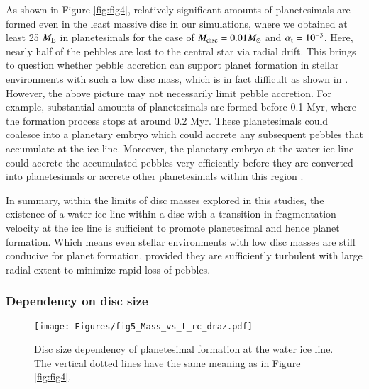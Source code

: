 \documentclass{aa}
\begin{document}
As shown in Figure \ref{fig:fig4}, relatively significant amounts of planetesimals are formed even in the least massive disc in our simulations, where we obtained at least 25 $M_{\rm{E}}$ in planetesimals for the case of $M_{\rm{disc}}=0.01 M_{\odot}$ and $\alpha_{\rm t}=10^{-3}$. Here, nearly half of the pebbles are lost to the central star via radial drift. This brings to question whether pebble accretion can support planet formation in stellar environments with such a low disc mass, which is in fact difficult as shown in \cite{SavvidouBitsch2023}. However, the above picture may not necessarily limit pebble accretion. For example, substantial amounts of planetesimals are formed before 0.1 Myr, where the formation process stops at around 0.2 Myr. These planetesimals could coalesce into a planetary embryo which could accrete any subsequent pebbles that accumulate at the ice line. Moreover, the planetary embryo at the water ice line could accrete the accumulated pebbles very efficiently before they are converted into planetesimals \citep{Morbidelli2020,Izidoro2021, Andama2022} or accrete other planetesimals within this region \citep{Chambers2023, BatyginMorbidelli2023}.

In summary, within the limits of disc masses explored in this studies, the existence of a water ice line within a disc with a transition in fragmentation velocity at the ice line is sufficient to promote planetesimal and hence planet formation. Which means even stellar environments with low disc masses are still conducive for planet formation, provided they are sufficiently turbulent with large radial extent to minimize rapid loss of pebbles.



\subsubsection{Dependency on disc size}
\begin{figure}
   \texttt{[image: Figures/fig5\_Mass\_vs\_t\_rc\_draz.pdf]}
   \caption{Disc size dependency of planetesimal formation at the water ice line. The vertical dotted lines have the same meaning as in Figure \ref{fig:fig4}.}
   \label{fig:fig5}
\end{figure}
\end{document}
